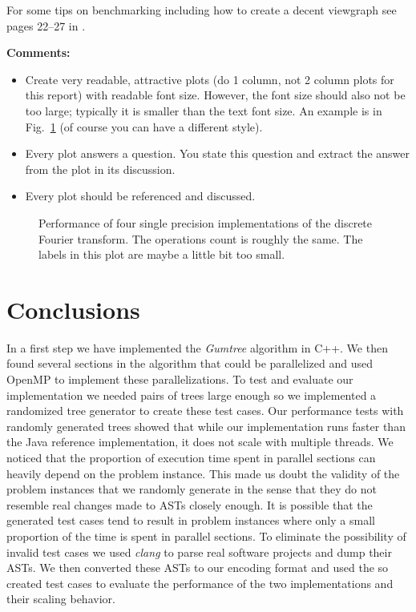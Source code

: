 \documentclass[letterpaper]{article}
\begin{document}
For some tips on benchmarking including how to create a decent viewgraph see pages 22--27 in \cite{Pueschel:10}.

{\bf Comments:}
\begin{itemize}
\item Create very readable, attractive plots (do 1 column, not 2 column plots
for this report) with readable font size. However, the font size should also not be too large; typically it is smaller than the text font size.
An example is in Fig.~\ref{fftperf} (of course you can have a different style).
\item Every plot answers a question. You state this question and extract the
answer from the plot in its discussion.
\item Every plot should be referenced and discussed.
\end{itemize}

\begin{figure}\centering
  \caption{Performance of four single precision implementations of the
  discrete Fourier transform. The operations count is roughly the
  same. The labels in this plot are maybe a little bit too small.\label{fftperf}}
\end{figure}

\section{Conclusions}

In a first step we have implemented the \emph{Gumtree} algorithm in C++.
We then found several sections in the algorithm that could be parallelized and used OpenMP to implement these parallelizations.
To test and evaluate our implementation we needed pairs of trees large enough so we implemented a randomized tree generator to create these test cases.
Our performance tests with randomly generated trees showed that while our implementation runs faster than the Java reference implementation, it does not scale with multiple threads.
We noticed that the proportion of execution time spent in parallel sections can heavily depend on the problem instance.
This made us doubt the validity of the problem instances that we randomly generate in the sense that they do not resemble real changes made to ASTs closely enough.
It is possible that the generated test cases tend to result in problem instances where only a small proportion of the time is spent in parallel sections.
To eliminate the possibility of invalid test cases we used \emph{clang} to parse real software projects and dump their ASTs.
We then converted these ASTs to our encoding format and used the so created test cases to evaluate the performance of the two implementations and their scaling behavior.
\end{document}
